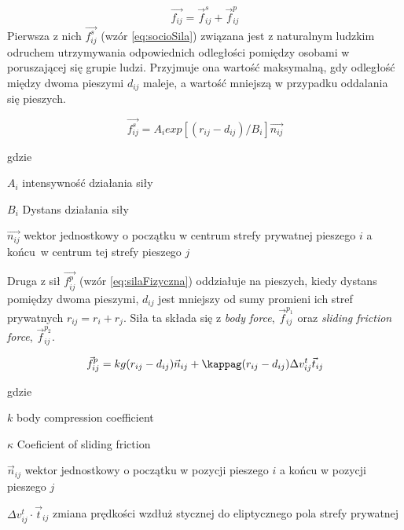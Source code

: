 \begin{equation}
\label{eq:sumaSil}
\vec{f_{ij}} = \vec{f}_{ij}^{s} + \vec{f}_{ij}^{p}
\end{equation}
Pierwsza z nich $\vec{f_{ij}^{s}}$ (wzór \ref{eq:socioSila}) związana jest z naturalnym ludzkim odruchem utrzymywania odpowiednich odległości pomiędzy osobami w poruszającej się grupie ludzi. Przyjmuje ona wartość maksymalną, gdy odległość między dwoma pieszymi $d_{ij}$ maleje, a wartość mniejszą w przypadku oddalania się pieszych.

\begin{equation}
\label{eq:socioSila}
\vec{f_{ij}^{s}} = A_{i} exp[(r_{ij} - d_{ij}) / B_{i}]\vec{n_{ij}}
\end{equation}

gdzie
\begin{eqwhere}[2cm]
	\item[$A_{i}$] intensywność działania siły
	\item[$B_{i}$] Dystans działania siły
	\item[$\vec{n_{ij}}$] wektor jednostkowy o początku w centrum strefy prywatnej pieszego $i$ a końcu~w centrum tej strefy pieszego $j$
\end{eqwhere}

Druga z sił $\vec{f_{ij}^{p}}$ (wzór \ref{eq:silaFizyczna}) oddziałuje na pieszych, kiedy dystans pomiędzy dwoma pieszymi, $d_{ij}$ jest mniejszy od sumy promieni ich stref prywatnych $r_{ij} = r_{i} + r_{j}$. Siła ta składa się z \textit{body force}, $\vec{f} _{ij}^{p_{1}}$ oraz \textit{sliding friction force}, $\vec{f} _{ij}^{p_{2}}$.

\begin{equation} \label{eq:silaFizyczna}
\vec{f}_{ij}^{p} = kg(r_{ij} - d_{ij})\vec{n}_{ij} + \kappag (r_{ij} - d_{ij}) \Delta v_{ij}^{t}\vec{t}_{ij}
\end{equation}

gdzie
\begin{eqwhere}[2cm]
	\item[$k$] body compression coefficient
	\item[$\kappa$] Coeficient of sliding friction
	\item[$\vec{n}_{ij}$] wektor jednostkowy o początku w pozycji pieszego $i$ a końcu w pozycji pieszego $j$
	\item[$\Delta v_{ij}^{t} \cdot \vec{t}_{ij}$] zmiana prędkości wzdłuż stycznej do eliptycznego pola strefy prywatnej
\end{eqwhere}

